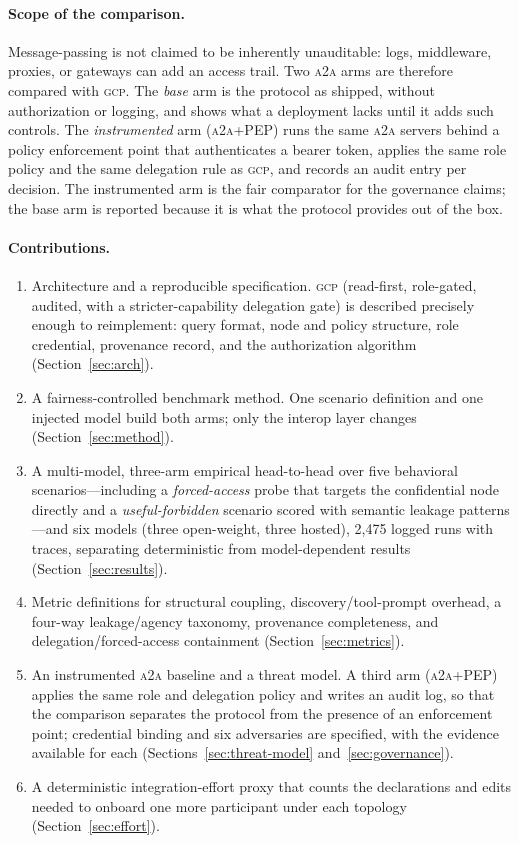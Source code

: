\documentclass[conference,letterpaper]{IEEEtran}
\newcommand{\gcp}{\textsc{gcp}}
\newcommand{\ata}{\textsc{a2a}}
\begin{document}
\paragraph{Scope of the comparison.} Message-passing is not claimed to be inherently unauditable:
logs, middleware, proxies, or gateways can add an access trail. Two \ata{} arms are therefore
compared with \gcp{}. The \emph{base} arm is the protocol as shipped, without authorization or
logging, and shows what a deployment lacks until it adds such controls. The \emph{instrumented} arm
(\ata{}+PEP) runs the same \ata{} servers behind a policy enforcement point that authenticates a
bearer token, applies the same role policy and the same delegation rule as \gcp{}, and records an
audit entry per decision. The instrumented arm is the fair comparator for the governance claims; the
base arm is reported because it is what the protocol provides out of the box.

\paragraph{Contributions.}
\begin{enumerate}
  \item Architecture and a reproducible specification. \gcp{} (read-first,
  role-gated, audited, with a stricter-capability delegation gate) is described precisely enough to reimplement:
  query format, node and policy structure, role credential, provenance record, and the
  authorization algorithm (Section~\ref{sec:arch}).
  \item A fairness-controlled benchmark method. One scenario definition and one injected
  model build both arms; only the interop layer changes (Section~\ref{sec:method}).
  \item A multi-model, three-arm empirical head-to-head over five behavioral scenarios---including a
  \emph{forced-access} probe that targets the confidential node directly and a
  \emph{useful-forbidden} scenario scored with semantic leakage patterns---and six models (three
  open-weight, three hosted), 2{,}475 logged runs with traces, separating deterministic from
  model-dependent results (Section~\ref{sec:results}).
  \item Metric definitions for structural coupling, discovery/tool-prompt overhead, a
  four-way leakage/agency taxonomy, provenance completeness, and delegation/forced-access containment
    (Section~\ref{sec:metrics}).
  \item An instrumented \ata{} baseline and a threat model. A third arm (\ata{}+PEP) applies the same
  role and delegation policy and writes an audit log, so that the comparison separates the protocol from
  the presence of an enforcement point; credential binding and six adversaries are specified, with the
  evidence available for each (Sections~\ref{sec:threat-model} and~\ref{sec:governance}).
  \item A deterministic integration-effort proxy that counts the declarations and edits needed to onboard
  one more participant under each topology (Section~\ref{sec:effort}).
\end{enumerate}
\end{document}
